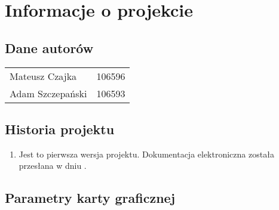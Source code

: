 
\section{Informacje o projekcie}

\subsection{Dane autorów}

\begin{center}
\begin{tabular}{l r}
Mateusz Czajka & 106596 \\
Adam Szczepański & 106593
\end{tabular}
\end{center}

\subsection{Historia projektu}


\begin{center}
\begin{enumerate}
\item Jest to pierwsza wersja projektu. Dokumentacja elektroniczna została przesłana w dniu .
\end{enumerate}
\end{center}

\subsection{Parametry karty graficznej}

